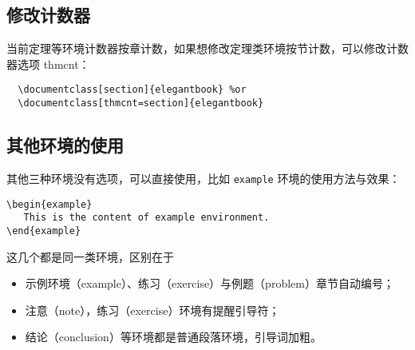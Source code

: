 \documentclass[lang=cn,10pt]{elegantbook}
\begin{document}
 


\subsection{修改计数器}

当前定理等环境计数器按章计数，如果想修改定理类环境按节计数，可以修改计数器选项 thmcnt：

\begin{lstlisting}
  \documentclass[section]{elegantbook} %or
  \documentclass[thmcnt=section]{elegantbook}
\end{lstlisting}


\subsection{其他环境的使用}

其他三种环境没有选项，可以直接使用，比如 \lstinline{example} 环境的使用方法与效果：
\begin{lstlisting}
\begin{example}
   This is the content of example environment.
\end{example}
\end{lstlisting}

这几个都是同一类环境，区别在于

\begin{itemize}
  \item 示例环境（example）、练习（exercise）与例题（problem）章节自动编号；
  \item 注意（note），练习（exercise）环境有提醒引导符；
  \item 结论（conclusion）等环境都是普通段落环境，引导词加粗。
\end{itemize}
\end{document}
